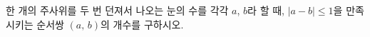 \hspace*{2mm}\begin{minipage}[t]{\dimexpr\linewidth-2mm\relax}\vspace{0pt}
한 개의 주사위를 두 번 던져서 나오는 눈의 수를 각각 $a$, $b$라 할 때, $|a-b|\le 1$을 만족시키는 순서쌍 $(a,\,b)$의 개수를 구하시오.\end{minipage}
